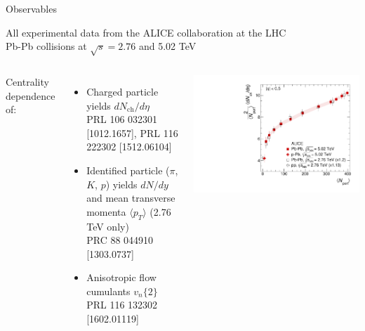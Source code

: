 \documentclass{beamer}
\begin{document}
\begin{frame}{Observables}
  \begin{center}
    All experimental data from the ALICE collaboration at the LHC \\
    Pb-Pb collisions at $\sqrt s = 2.76$ and 5.02 TeV
  \end{center}
  \begin{columns}
    Centrality dependence of: \\[1ex]
    \begin{itemize}
      \setlength{\itemsep}{1.5ex}
      \item Charged particle yields $dN_\text{ch}/d\eta$ \\
        {\tiny PRL 106 032301 [1012.1657], PRL 116 222302 [1512.06104]}
      \item Identified particle ($\pi$, $K$, $p$) yields $dN/dy$
        and mean transverse momenta $\langle p_T \rangle$ (2.76 TeV only) \\
        {\tiny PRC 88 044910 [1303.0737]}
      \item Anisotropic flow cumulants $v_n\{2\}$ \\
        {\tiny PRL 116 132302 [1602.01119]}
    \end{itemize}
    \centering
    \includegraphics[height=.25\textheight]{exptfigs/nch}
    \hfill

\end{columns}
\end{frame}
\end{document}
